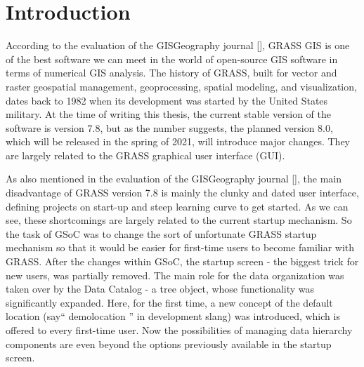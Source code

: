 \documentclass[a4paper,10pt,twoside]{article}
\begin{document}
\newpage
\vspace*{-1cm}
\pagestyle{fancy}
\section*{Introduction}
\large
\setcounter{page}{13}  %

\noindent According to the evaluation of the GISGeography journal [], GRASS GIS is one of the best software we can meet in the world of open-source GIS software in terms of numerical GIS analysis. The history of GRASS, built for vector and raster geospatial management, geoprocessing, spatial modeling, and visualization, dates back to 1982 when its development was started by the United States military. At the time of writing this thesis, the current stable version of the software is version 7.8, but as the number suggests, the planned version 8.0, which will be released in the spring of 2021, will introduce major changes. They are largely related to the GRASS graphical user interface (GUI).

As also mentioned in the evaluation of the GISGeography journal [], the main disadvantage of GRASS version 7.8 is mainly the clunky and dated user interface, defining projects on start-up and steep learning curve to get started. As we can see, these shortcomings are largely related to the current startup mechanism. So the task of GSoC was to change the sort of unfortunate GRASS startup mechanism so that it would be easier for first-time users to become familiar with GRASS. After the changes within GSoC, the startup screen -  the biggest trick for new users, was partially removed. The main role for the data organization was taken over by the Data Catalog - a tree object, whose functionality was significantly expanded. Here, for the first time, a new concept of the default location (say`` demolocation '' in development slang) was introduced, which is offered to every first-time user. Now the possibilities of managing data hierarchy components are even beyond the options previously available in the startup screen. 
\end{document}
